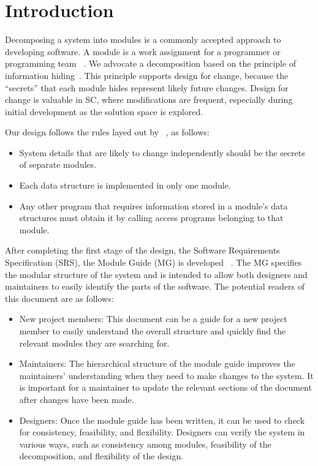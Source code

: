 \documentclass[12pt, titlepage]{article}
\begin{document}
\listoftables

\listoffigures

\newpage


\section{Introduction}

Decomposing a system into modules is a commonly accepted approach to developing
software.  A module is a work assignment for a programmer or programming
team ~\cite{Parnas1972a}.  We advocate a decomposition
based on the principle of information hiding~\citep{Parnas1972a}.  This
principle supports design for change, because the ``secrets'' that each module
hides represent likely future changes.  Design for change is valuable in SC,
where modifications are frequent, especially during initial development as the
solution space is explored.  

Our design follows the rules layed out by ~\citet{ParnasEtAl1984}, as follows:
\begin{itemize}
\item System details that are likely to change independently should be the
  secrets of separate modules.
\item Each data structure is implemented in only one module.
\item Any other program that requires information stored in a module's data
  structures must obtain it by calling access programs belonging to that module.
\end{itemize}

After completing the first stage of the design, the Software Requirements
Specification (SRS), the Module Guide (MG) is developed ~\citep{ParnasEtAl1984}. The MG
specifies the modular structure of the system and is intended to allow both
designers and maintainers to easily identify the parts of the software.  The
potential readers of this document are as follows:

\begin{itemize}
\item New project members: This document can be a guide for a new project member
  to easily understand the overall structure and quickly find the
  relevant modules they are searching for.
\item Maintainers: The hierarchical structure of the module guide improves the
  maintainers' understanding when they need to make changes to the system. It is
  important for a maintainer to update the relevant sections of the document
  after changes have been made.
\item Designers: Once the module guide has been written, it can be used to
  check for consistency, feasibility, and flexibility. Designers can verify the
  system in various ways, such as consistency among modules, feasibility of the
  decomposition, and flexibility of the design.
\end{itemize}
\end{document}
